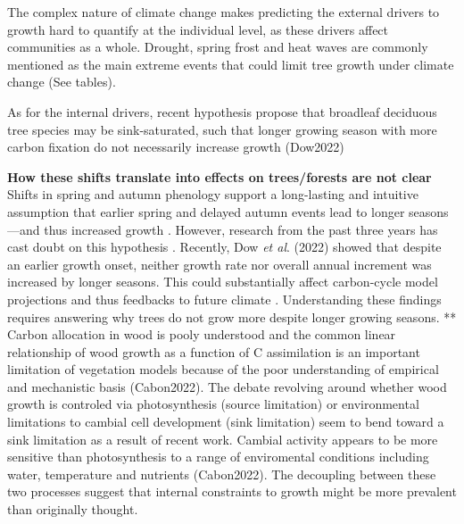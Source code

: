 \documentclass{article}
\begin{document}
The complex nature of climate change makes predicting the external drivers to growth hard to quantify at the individual level, as these drivers affect communities as a whole. Drought, spring frost and heat waves are commonly mentioned as the main extreme events that could limit tree growth under climate change \cite{tyree_xylem_2002, choat_triggers_2018, li_widespread_2023,trenberth_global_2014,intergovernmental_panel_on_climate_change_detection_2014,chiang_evidence_2021,polgar_leafout_2011,reinmann_compensatory_2023} (See tables). 

As for the internal drivers, recent hypothesis propose that broadleaf deciduous tree species may be sink-saturated, such that longer growing season with more carbon fixation do not necessarily increase growth (Dow2022)

\textbf{How these shifts translate into effects on trees/forests are not clear}
Shifts in spring and autumn phenology support a long-lasting and intuitive assumption that earlier spring and delayed autumn events lead to longer seasons---and thus increased growth \cite{keenan_net_2014}. However, research from the past three years has cast doubt on this hypothesis \cite{dow_warm_2022,green_limits_2022,silvestro_longer_2023}. Recently, Dow \textit{et al}. (2022) showed that despite an earlier growth onset, neither growth rate nor overall annual increment was increased by longer seasons. This could substantially affect carbon-cycle model projections and thus feedbacks to future climate \cite{richardson_climate_2013,swidrak_comparing_2013}. 
Understanding these findings requires answering why trees do not grow more despite longer growing seasons. ** Carbon allocation in wood is pooly understood and the common linear relationship of wood growth as a function of C assimilation is an important limitation of vegetation models because of the poor understanding of empirical and mechanistic basis (Cabon2022). The debate revolving around whether wood growth is controled via photosynthesis (source limitation) or environmental limitations to cambial cell development (sink limitation) seem to bend toward a sink limitation as a result of recent work. Cambial activity appears to be more sensitive than photosynthesis to a range of enviromental conditions including water, temperature and nutrients (Cabon2022). The decoupling between these two processes suggest that internal constraints to growth might be more prevalent than originally thought.
\end{document}
